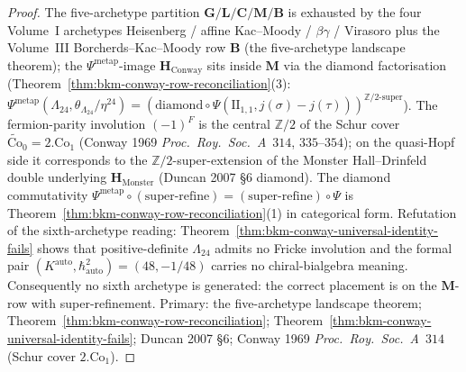 \begin{proof}[Proof]
The five-archetype partition
$\mathbf{G}/\mathbf{L}/\mathbf{C}/\mathbf{M}/\mathbf{B}$ is
exhausted by the four Volume~I archetypes
Heisenberg / affine Kac--Moody / $\beta\gamma$ / Virasoro plus
the Volume~III Borcherds--Kac--Moody row $\mathbf{B}$
(the five-archetype landscape theorem); the
$\Psi^{\mathrm{metap}}$-image $\mathbf{H}_{\mathrm{Conway}}$ sits
inside $\mathbf{M}$ via the diamond factorisation
(Theorem~\ref{thm:bkm-conway-row-reconciliation}\textup{(3)}:
$\Psi^{\mathrm{metap}}(\Lambda_{24},\theta_{\Lambda_{24}}/\eta^{24})
= (\mathrm{diamond}\circ\Psi(\mathrm{II}_{1,1},
j(\sigma) - j(\tau)))^{\mathbb{Z}/2\text{-}\mathrm{super}}$).
The fermion-parity involution $(-1)^F$ is the central
$\mathbb{Z}/2$ of the Schur cover
$\widetilde{\mathrm{Co}}_0 = 2.\mathrm{Co}_1$ (Conway 1969
\emph{Proc.~Roy.~Soc.~A}~$314$, $335$--$354$);
on the quasi-Hopf side it corresponds to the
$\mathbb{Z}/2$-super-extension of the Monster Hall--Drinfeld
double underlying $\mathbf{H}_{\mathrm{Monster}}$ (Duncan 2007
\S$6$ diamond). The diamond commutativity
$\Psi^{\mathrm{metap}}\circ(\text{super-refine}) =
(\text{super-refine})\circ\Psi$ is
Theorem~\ref{thm:bkm-conway-row-reconciliation}\textup{(1)} in
categorical form.
Refutation of the sixth-archetype reading:
Theorem~\ref{thm:bkm-conway-universal-identity-fails} shows that
positive-definite $\Lambda_{24}$ admits no Fricke involution and
the formal pair $(K^{\mathrm{auto}},\hbar^2_{\mathrm{auto}}) =
(48,-1/48)$ carries no chiral-bialgebra meaning. Consequently no
sixth archetype is generated: the correct placement is on the
$\mathbf{M}$-row with super-refinement.
Primary:
the five-archetype landscape theorem;
Theorem~\ref{thm:bkm-conway-row-reconciliation};
Theorem~\ref{thm:bkm-conway-universal-identity-fails};
Duncan 2007 \S$6$;
Conway 1969 \emph{Proc.~Roy.~Soc.~A}~$314$ (Schur cover
$2.\mathrm{Co}_1$).
\end{proof}

